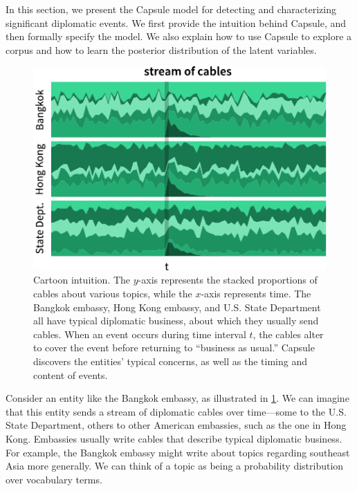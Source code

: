 
In this section, we present the Capsule model for detecting and
characterizing significant diplomatic events. We first provide the
intuition behind Capsule, and then formally specify the model. We also
explain how to use Capsule to explore a corpus and how to learn the
posterior distribution of the latent variables.

\begin{figure}
\centering
\includegraphics[width=\linewidth]{fig/cartoon.pdf}
\caption{Cartoon intuition. The $y$-axis represents the stacked
  proportions of cables about various topics, while the $x$-axis
  represents time. The Bangkok embassy, Hong Kong embassy, and
  U.S. State Department all have typical diplomatic business, about
  which they usually send cables. When an event occurs during time
  interval $t$, the cables alter to cover the event before returning
  to ``business as usual.'' Capsule discovers the entities' typical
  concerns, as well as the timing and content of events.}
\label{fig:cartoon}
\end{figure}

Consider an entity like the Bangkok embassy, as illustrated in
\cref{fig:cartoon}. We can imagine that this entity sends a stream of
diplomatic cables over time---some to the U.S. State Department,
others to other American embassies, such as the one in Hong
Kong. Embassies usually write cables that describe typical diplomatic
business. For example, the Bangkok embassy might write about topics
regarding southeast Asia more generally. We can think of a topic as
being a probability distribution over vocabulary terms.

